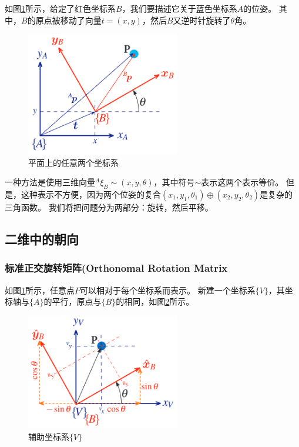 \documentclass[UTF8,a4paper,10pt]{ctexart}
\begin{document}
如图\ref{fig:two_frame_2D}所示，给定了红色坐标系${B}$，我们要描述它关于蓝色坐标系${A}$的位姿。
其中，${B}$的原点被移动了向量$t=(x,y)$，然后${B}$又逆时针旋转了$\theta$角。
\begin{figure}[htbp]
  \centerline{\includegraphics[width=0.6\textwidth]{two_frame_2D}}
  \caption{平面上的任意两个坐标系}
  \label{fig:two_frame_2D}
\end{figure}
一种方法是使用三维向量${}^A\xi_B\sim(x,y,\theta)$，其中符号$\sim$表示这两个表示等价。
但是，这种表示不方便，因为两个位姿的复合$(x_1,y_1,\theta_1)\oplus(x_2,y_2,\theta_2)$是复杂的三角函数。
我们将把问题分为两部分：旋转，然后平移。

\subsection{二维中的朝向}
\subsubsection{标准正交旋转矩阵(Orthonomal Rotation Matrix}

如图\ref{fig:two_frame_2D}所示，任意点$P$可以相对于每个坐标系而表示。
新建一个坐标系$\{V\}$，其坐标轴与$\{A\}$的平行，原点与$\{B\}$的相同，如图\ref{fig:two_frame_2D_V}所示。
\begin{figure}[htbp]
  \centerline{\includegraphics[width=0.6\textwidth]{two_frame_2D_V}}
  \caption{辅助坐标系$\{V\}$}
  \label{fig:two_frame_2D_V}
\end{figure}
\end{document}

